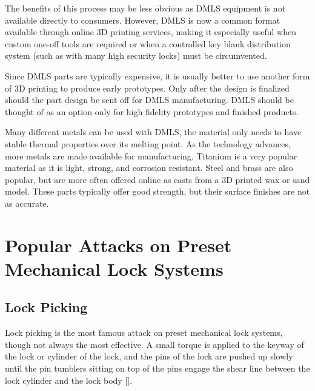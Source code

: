 \documentclass{acm_proc_article-sp}
\begin{document}
The benefits of this process may be less obvious as DMLS equipment is not available directly to consumers. However, DMLS is now a common format available through online 3D printing services, making it especially useful when custom one-off tools are required or when a controlled key blank distribution system (such as with many high security locks) must be circumvented.

Since DMLS parts are typically expensive, it is usually better to use another form of 3D printing to produce early prototypes. Only after the design is finalized should the part design be sent off for DMLS manufacturing. DMLS should be thought of as an option only for high fidelity prototypes and finished products.

Many different metals can be used with DMLS, the material only needs to have stable thermal properties over its melting point. As the technology advances, more metals are made available for manufacturing. Titanium is a very popular material as it is light, strong, and corrosion resistant. Steel and brass are also popular, but are more often offered online as casts from a 3D printed wax or sand model. These parts typically offer good strength, but their surface finishes are not as accurate.

\section{Popular Attacks on Preset Mechanical Lock Systems}
\subsection{Lock Picking}
Lock picking is the most famous attack on preset mechanical lock systems, though not always the most effective. A small torque is applied to the keyway of the lock or cylinder of the lock, and the pins of the lock are pushed up slowly until the pin tumblers sitting on top of the pins engage the shear line between the lock cylinder and the lock body [\citealt{TOOOL1}].
\end{document}
